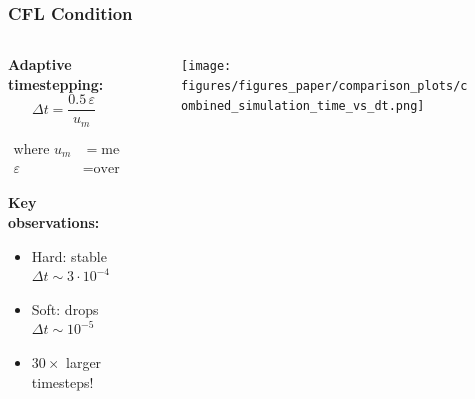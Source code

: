 \documentclass[10pt,t]{beamer}
\begin{document}
\begin{frame}
    \frametitle{CFL Condition}

    \vspace{0.5cm}

    \begin{columns}
        \begin{column}{0.52\textwidth}
            \textbf{Adaptive timestepping:}
            \begin{equation*}
                \Delta t = \frac{0.5 \, \varepsilon}{u_m}
            \end{equation*}

            \vspace{-0.5cm}

            \begin{equation*}
                \begin{align}
                    \text{where }   u_m & = \text{median velocity},  \\
                    \varepsilon         & = \text{overlap tolerance}
                \end{align}
            \end{equation*}

            \textbf{Key observations:}
            \begin{itemize}
                \item Hard: stable $\Delta t \sim 3 \cdot 10^{-4}$
                \item Soft: drops $\Delta t \sim 10^{-5}$
                \item $30\times$ larger timesteps!
            \end{itemize}
        \end{column}

        \begin{column}{0.52\textwidth}
            \begin{figure}
                \centering
                \texttt{[image: figures/figures\_paper/comparison\_plots/combined\_simulation\_time\_vs\_dt.png]}
            \end{figure}
        \end{column}
    \end{columns}

\end{frame}
\end{document}
